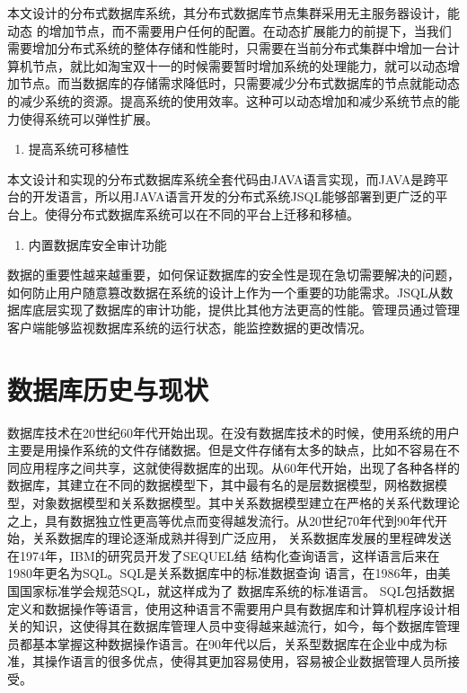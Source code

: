 	本文设计的分布式数据库系统，其分布式数据库节点集群采用无主服务器设计，能动态
	的增加节点，而不需要用户任何的配置。在动态扩展能力的前提下，当我们需要增加分布式系统的整体存储和性能时，只需要在当前分布式集群中增加一台计算机节点，就比如淘宝双十一的时候需要暂时增加系统的处理能力，就可以动态增加节点。而当数据库的存储需求降低时，只需要减少分布式数据库的节点就能动态的减少系统的资源。提高系统的使用效率。这种可以动态增加和减少系统节点的能力使得系统可以弹性扩展。
	
	\begin{enumerate}[resume]
		\item 提高系统可移植性
	\end{enumerate}

	本文设计和实现的分布式数据库系统全套代码由JAVA语言实现，而JAVA是跨平台的开发语言，所以用JAVA语言开发的分布式系统JSQL能够部署到更广泛的平台上。使得分布式数据库系统可以在不同的平台上迁移和移植。
	
	\begin{enumerate}[resume]
		\item 内置数据库安全审计功能
	\end{enumerate}

	数据的重要性越来越重要，如何保证数据库的安全性是现在急切需要解决的问题，如何防止用户随意篡改数据在系统的设计上作为一个重要的功能需求。JSQL从数据库底层实现了数据库的审计功能，提供比其他方法更高的性能。管理员通过管理客户端能够监视数据库系统的运行状态，能监控数据的更改情况。
\section{数据库历史与现状}
数据库技术在20世纪60年代开始出现。在没有数据库技术的时候，使用系统的用户主要是用操作系统的文件存储数据。但是文件存储有太多的缺点，比如不容易在不同应用程序之间共享，这就使得数据库的出现。从60年代开始，出现了各种各样的数据库，其建立在不同的数据模型下，其中最有名的是层数据模型，网格数据模型，对象数据模型和关系数据模型。其中关系数据模型建立在严格的关系代数理论之上，具有数据独立性更高等优点而变得越发流行。从20世纪70年代到90年代开始，关系数据库的理论逐渐成熟并得到广泛应用，
关系数据库发展的里程碑发送在1974年，IBM的研究员开发了SEQUEL结
结构化查询语言，这样语言后来在1980年更名为SQL。SQL是关系数据库中的标准数据查询
语言，在1986年，由美国国家标准学会规范SQL，就这样成为了
数据库系统的标准语言。 SQL包括数据定义和数据操作等语言，使用这种语言不需要用户具有数据库和计算机程序设计相关的知识，这使得其在数据库管理人员中变得越来越流行，如今，每个数据库管理员都基本掌握这种数据操作语言。在90年代以后，关系型数据库在企业中成为标准，其操作语言的很多优点，使得其更加容易使用，容易被企业数据管理人员所接受。

